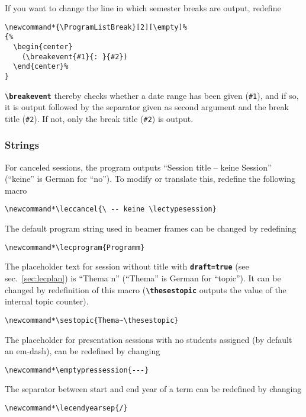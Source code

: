 \documentclass[english]{article}
\newcommand*\jmacro[1]{\textbf{\texttt{#1}}}
\newcommand*\jcsmacro[1]{\jmacro{\textbackslash{#1}}}
\newcommand*\joption[1]{\textbf{\texttt{#1}}}
\newcommand*\jparam[1]{\angus #1\angud}
\begin{document}
%
If you want to change the line in which semester breaks are output, redefine
\begin{lstlisting}[language={[LaTeX]TeX},basicstyle={\small\ttfamily},frame=single,
frame=single,moretexcs={[1]{breakevent}}]
\newcommand*{\ProgramListBreak}[2][\empty]%
{%
  \begin{center}
    (\breakevent{#1}{: }{#2})
  \end{center}%
}
\end{lstlisting}
%
\jcsmacro{breakevent} thereby checks whether a date range has been given (\texttt{\#1}),
and if so, it is output followed by the separator given as second argument and the break
title (\texttt{\#2}). If not, only the break title (\texttt{\#2}) is output.

\subsubsection{Strings}\label{sec:custstrings}

For canceled sessions, the program outputs
``\jparam{Session title} -- keine \jparam{Session}'' (``keine''
is German for ``no''). To modify or translate this, redefine the
following macro
\begin{lstlisting}[language={[LaTeX]TeX},basicstyle={\small\ttfamily},frame=single,
                   moretexcs={[2]{leccancel,lectypesession}}]
\newcommand*\leccancel{\ -- keine \lectypesession}
\end{lstlisting}
The default program string used in beamer frames can be changed by
redefining
\begin{lstlisting}[language={[LaTeX]TeX},basicstyle={\small\ttfamily},frame=single,
                             moretexcs={[1]{lecprogram}}]
\newcommand*\lecprogram{Programm}
\end{lstlisting}
The placeholder text for session without title with \joption{draft=true}
(see sec.~\ref{sec:lecplan}) is ``Thema \jparam{n}'' (``Thema'' is German for ``topic'').
It can be changed by redefinition of this macro (\jcsmacro{thesestopic} outputs
the value of the internal topic counter).
\begin{lstlisting}[language={[LaTeX]TeX},basicstyle={\small\ttfamily},frame=single,
                   moretexcs={[2]{sestopic,thesestopic}}]
\newcommand*\sestopic{Thema~\thesestopic}
\end{lstlisting}
%
The placeholder for presentation sessions with no students assigned (by default
an em-dash), can be redefined by changing
\begin{lstlisting}[language={[LaTeX]TeX},basicstyle={\small\ttfamily},frame=single,
moretexcs={[1]{emptypressession}}]
\newcommand*\emptypressession{---}
\end{lstlisting}
%
The separator between start and end year of a term can be redefined by changing
\begin{lstlisting}[language={[LaTeX]TeX},basicstyle={\small\ttfamily},frame=single,
moretexcs={[1]{lecendyearsep}}]
\newcommand*\lecendyearsep{/}
\end{lstlisting}
\end{document}
